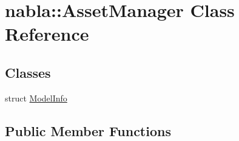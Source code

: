 \hypertarget{classnabla_1_1_asset_manager}{}\section{nabla\+::Asset\+Manager Class Reference}
\label{classnabla_1_1_asset_manager}
\subsection*{Classes}
\begin{DoxyCompactItemize}
\item 
struct \mbox{\hyperlink{structnabla_1_1_asset_manager_1_1_model_info}{Model\+Info}}
\end{DoxyCompactItemize}
\subsection*{Public Member Functions}
